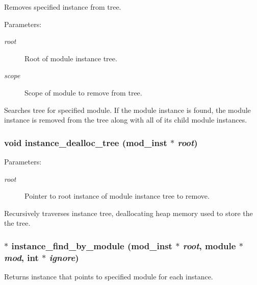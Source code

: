 Removes specified instance from tree.

\begin{Desc}
\item[Parameters:]
\begin{description}
\item[{\em root}]Root of module instance tree. \item[{\em scope}]Scope of module to remove from tree.\end{description}
\end{Desc}
Searches tree for specified module. If the module instance is found, the module instance is removed from the tree along with all of its child module instances. 
\subsubsection{\setlength{\rightskip}{0pt plus 5cm}void instance\_\-dealloc\_\-tree ({\bf mod\_\-inst} $\ast$ {\em root})}\label{instance_8c_a11}


\begin{Desc}
\item[Parameters:]
\begin{description}
\item[{\em root}]Pointer to root instance of module instance tree to remove.\end{description}
\end{Desc}
Recursively traverses instance tree, deallocating heap memory used to store the the tree. 
\subsubsection{$\ast$ instance\_\-find\_\-by\_\-module ({\bf mod\_\-inst} $\ast$ {\em root}, {\bf module} $\ast$ {\em mod}, int $\ast$ {\em ignore})}\label{instance_8c_a4}


Returns instance that points to specified module for each instance.


